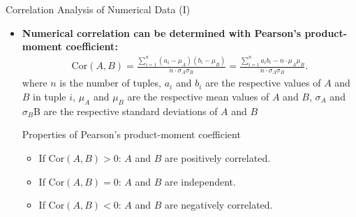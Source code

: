 \begin{frame}{Correlation Analysis of Numerical Data (I)}
	\begin{itemize}
		\item \textbf{Numerical correlation can be determined with
				      {\color{airforceblue}Pearson's product-moment coefficient}:}
		      \begin{align*}
			      \text{Cor}(A, B) = \frac{\sum_{i=1}^{n}
				      (a_i-\mu_{A})(b_i-\mu_{B})}{n\cdot\sigma_{A}\sigma_{B}} =
			      \frac{\sum_{i=1}^{n} a_i b_i -n\cdot\mu_{A}\mu_{B}}{n\cdot
				      \sigma_{A}\sigma_{B}}.
		      \end{align*}
		      where $n$ is the number of tuples, $a_i$ and $b_i$ are the
		      respective values of $A$ and $B$ in tuple $i$,
		      $\mu_A$ and $\mu_B$ are the respective mean values of $A$ and $B$,
		      $\sigma_{A}$ and $\sigma_{B}$B are the respective standard
		      deviations of $A$ and $B$
		      \begin{block}{Properties of Pearson's product-moment coefficient}
			      \begin{itemize}
				      \item If $\text{Cor}(A, B) > 0$: $A$ and $B$ are positively
				            correlated.
				      \item If $\text{Cor}(A, B) = 0$: $A$ and $B$ are independent.
				      \item If $\text{Cor}(A, B) < 0$: $A$ and $B$ are negatively
				            correlated.
			      \end{itemize}
		      \end{block}
	\end{itemize}
\end{frame}

